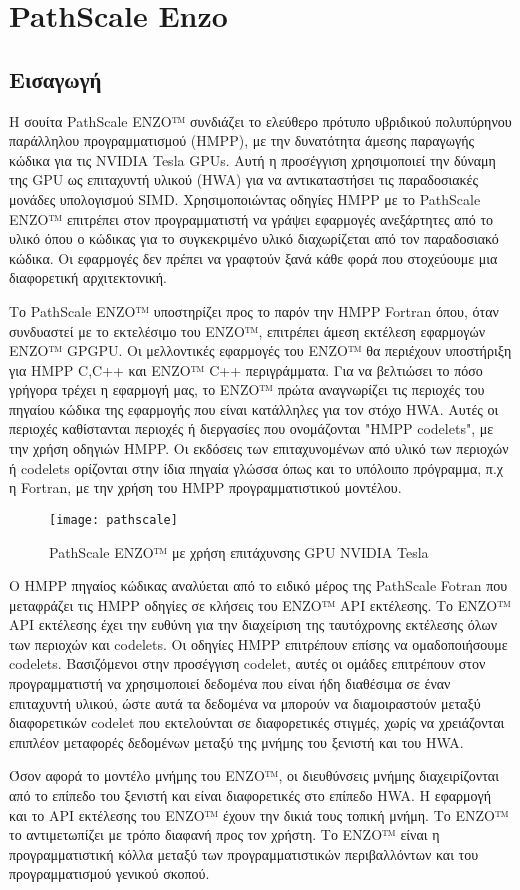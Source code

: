 \section{PathScale Enzo}
\subsection{Εισαγωγή}
Η σουίτα PathScale ENZO™ συνδιάζει το ελεύθερο πρότυπο υβριδικού πολυπύρηνου παράλληλου προγραμματισμού (HMPP), με την δυνατότητα άμεσης παραγωγής κώδικα για τις NVIDIA Tesla GPUs. Αυτή η προσέγγιση χρησιμοποιεί την δύναμη της GPU ως επιταχυντή υλικού (HWA) για να αντικαταστήσει τις παραδοσιακές μονάδες υπολογισμού SIMD. Χρησιμοποιώντας οδηγίες HMPP με το PathScale ENZO™ επιτρέπει στον προγραμματιστή να γράψει εφαρμογές ανεξάρτητες από το υλικό όπου ο κώδικας για το συγκεκριμένο υλικό διαχωρίζεται από τον παραδοσιακό κώδικα. Οι εφαρμογές δεν πρέπει να γραφτούν ξανά κάθε φορά που στοχεύουμε μια διαφορετική αρχιτεκτονική. 

Το PathScale ENZO™ υποστηρίζει προς το παρόν την HMPP Fortran όπου, όταν συνδυαστεί με το εκτελέσιμο του ENZO™, επιτρέπει άμεση εκτέλεση εφαρμογών ENZO™ GPGPU. Οι μελλοντικές εφαρμογές του ENZO™ θα περιέχουν υποστήριξη για HMPP C,C++ και ENZO™ C++ περιγράμματα. Για να βελτιώσει το πόσο γρήγορα τρέχει η εφαρμογή μας, το ENZO™ πρώτα αναγνωρίζει τις περιοχές του πηγαίου κώδικα της εφαρμογής που είναι κατάλληλες για τον στόχο HWA. Αυτές οι περιοχές καθίστανται περιοχές ή διεργασίες που ονομάζονται "HMPP codelets", με την χρήση οδηγιών HMPP. Οι εκδόσεις των επιταχυνομένων από υλικό των περιοχών ή codelets ορίζονται στην ίδια πηγαία γλώσσα όπως και το υπόλοιπο πρόγραμμα, π.χ η Fortran, με την χρήση του HMPP προγραμματιστικού μοντέλου.\cite{pathscale-1}

\begin{figure}[h]
	\texttt{[image: pathscale]}
	\centering
	\caption{PathScale ENZO™ με χρήση επιτάχυνσης GPU NVIDIA Tesla}
\end{figure}


Ο HMPP πηγαίος κώδικας αναλύεται από το ειδικό μέρος της PathScale Fotran που μεταφράζει τις HMPP οδηγίες σε κλήσεις του ENZO™ API εκτέλεσης. Το ENZO™ API εκτέλεσης έχει την ευθύνη για την διαχείριση της ταυτόχρονης εκτέλεσης όλων των περιοχών και codelets. Οι οδηγίες HMPP επιτρέπουν επίσης να ομαδοποιήσουμε codelets. Βασιζόμενοι στην προσέγγιση codelet, αυτές οι ομάδες επιτρέπουν στον προγραμματιστή να χρησιμοποιεί δεδομένα που είναι ήδη διαθέσιμα σε έναν επιταχυντή υλικού, ώστε αυτά τα δεδομένα να μπορούν να διαμοιραστούν μεταξύ διαφορετικών codelet που εκτελούνται σε διαφορετικές στιγμές, χωρίς να χρειάζονται επιπλέον μεταφορές δεδομένων μεταξύ της μνήμης του ξενιστή και του HWA.

Όσον αφορά το μοντέλο μνήμης του ENZO™, οι διευθύνσεις μνήμης διαχειρίζονται από το επίπεδο του ξενιστή και είναι διαφορετικές στο επίπεδο HWA. Η εφαρμογή και το API εκτέλεσης του ENZO™ έχουν την δικιά τους τοπική μνήμη. Το ENZO™ το αντιμετωπίζει με τρόπο διαφανή προς τον χρήστη. Το ENZO™ είναι η προγραμματιστική κόλλα μεταξύ των προγραμματιστικών περιβαλλόντων και του προγραμματισμού γενικού σκοπού.

